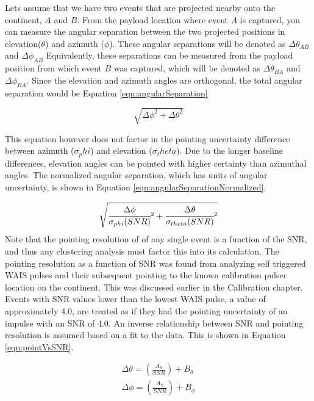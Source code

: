 		
		Lets assume that we have two events that are projected nearby onto the continent, $A$ and $B$.  From the payload location where event $A$ is captured, you can measure the angular separation between the two projected positions in elevation($\theta$) and azimuth ($\phi$).  These angular separations will be denoted as $\Delta\theta_{AB}$ and $\Delta\phi_{AB}$  Equivalently, these separations can be measured from the payload position from which event $B$ was captured, which will be denoted as $\Delta\theta_{BA}$ and $\Delta\phi_{BA}$.  Since the elevation and azimuth angles are orthogonal, the total angular separation would be Equation \ref{eqn:angularSeparation}
		
	\begin{equation}
		\sqrt{\Delta\phi^2 + \Delta\theta^2}
		\label{eqn:angularSeparation}
	\end{equation}
	
	This equation however does not factor in the pointing uncertainty difference between azimuth ($\sigma_phi$) and elevation ($\sigma_theta$). Due to the longer baseline differences, elevation angles can be pointed with higher certainty than azimuthal angles.  The normalized angular separation, which has units of angular uncertainty, is shown in Equation \ref{eqn:angularSeparationNormalized}.
	
	\begin{equation}
		\sqrt{\cfrac{\Delta\phi}{\sigma_{phi}(SNR)}^2 + \cfrac{\Delta\theta}{\sigma_{theta}(SNR)}^2}
		\label{eqn:angularSeparationNormalized}
	\end{equation}
		Note that the pointing resolution  of of any single event is a function of the SNR, and thus any clustering analysis must factor this into its calculation.  The pointing resolution as a function of SNR was found from analyzing self triggered WAIS pulses and their subsequent pointing to the known calibration pulser location on the continent.  This was discussed earlier in the Calibration chapter.  Events with SNR values lower than the lowest WAIS pulse, a value of approximately 4.0, are treated as if they had the pointing uncertainty of an impulse with an SNR of 4.0.  An inverse relationship between SNR and pointing resolution is assumed based on a fit to the data.  This is shown in Equation \ref{eqn:pointVsSNR}.
		
		\begin{gather*}
		\Delta\theta = \left(\frac{A_{\theta}}{SNR}\right) + B_{\theta} \\
		\Delta\phi = \left(\frac{A_{\phi}}{SNR}\right) + B_{\phi} \\
		\label{eqn:pointVsSNR}
		\end{gather*}
				
